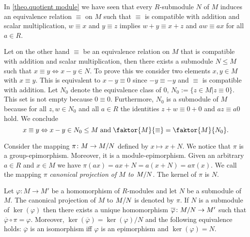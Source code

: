 \begin{rem}
\begin{exlist}
\item In \cref{theo.quotient module} we have seen that every $R$-sub\-mod\-ule $N$ of $M$ induces an equivalence relation $\equiv$ on $M$  such that $\equiv$ is compatible with addition and scalar multiplication, \ie{} $w\equiv x$ and $y\equiv z$ implies $w+y\equiv x+z$ and $aw\equiv ax$ for all $a\in R$. 

Let on the other hand $\equiv$ be an equivalence relation on $M$ that is compatible with addition and scalar multiplication, then there exists a submodule $N\leq M$ such that $x\equiv y\Leftrightarrow x-y\in N$. To prove this we consider two elements $x,y\in M$ with $x\equiv y$. This is equivalent to $x-y\equiv 0$ since $-y\equiv -y$ and $\equiv$ is compatible with addition. Let $N_0$ denote the equivalence class of 0, \ie{} $N_0:=\lbrace z\in M|z\equiv 0\rbrace$. This set is not empty because $0\equiv 0$. Furthermore, $N_0$ is a submodule of $M$ because for all $z ,w\in N_0$ and all $a\in R$ the identities $z +w\equiv 0+0$ and $az\equiv a0$ hold. We conclude
\begin{equation*}
x\equiv y\Leftrightarrow x-y\in N_0\leq M \;\text{and}\; \faktor{M}{\equiv}=\faktor{M}{N_0}.
\end{equation*}
\item Consider the mapping $\pi\colon M\rightarrow M/N$ defined by $x\mapsto x+N$. We notice that $\pi$ is a group-epimorphism. Moreover, it is a module-epimorphism. Given an arbitrary $a\in R$ and $x\in M$ we have $\pi(ax)=ax+N=a(x+N)=a\pi(x)$. We call the mapping $\pi$ \emph{canonical projection of $M$ to $M/N$}. The kernel of $\pi$ is $N$.
\end{exlist}
\end{rem}

\begin{thm}\label{theo.Universal Property}
Let $\varphi\colon M \to M'$ be a homomorphism of $R$-modules and let $N$ be a submodule of $M$. The canonical projection of $M$ to $M/N$ is denoted by $\pi$. If $N$ is a submodule of $\ker(\varphi)$ then there exists a unique homomorphism $\overline{\varphi}\colon M/N\rightarrow M'$ such that $\overline{\varphi}\circ\pi=\varphi$. Moreover, $\ker(\overline{\varphi})=\ker(\varphi)/N$ and the following equivalence holds: $\overline{\varphi}$ is an isomorphism iff $\varphi$ is an epimorphism and $\ker(\varphi)=N$.
\end{thm}

